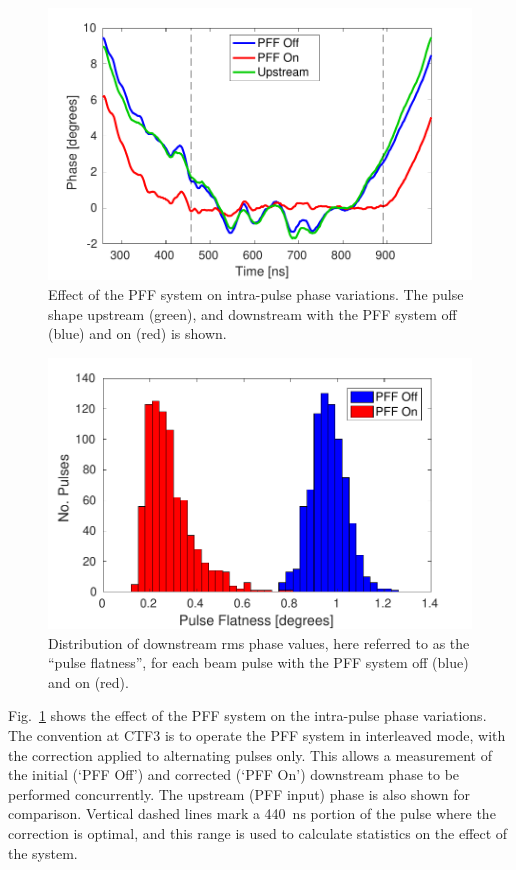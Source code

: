 \documentclass[%
 reprint,
superscriptaddress,
 amsmath,amssymb,
 prl,
]{revtex4-1}
\begin{document}
\begin{figure}
	\includegraphics[width=\columnwidth]{figs/shape}%
	\caption{\label{fig:shape}Effect of the PFF system on intra-pulse phase 
		variations. The pulse shape upstream (green), and downstream with the 
		PFF 
		system off (blue) and on (red) is shown.}
\end{figure}

\begin{figure}
	\includegraphics[width=\columnwidth]{figs/flatness}%
	\caption{\label{fig:flatness}Distribution of downstream rms phase values, 
		here 
		referred to as the 
		``pulse flatness'', for each beam pulse with the PFF system off (blue) 
		and 
		on (red).}
\end{figure}

Fig.~\ref{fig:shape} shows the effect of the PFF system on the intra-pulse 
phase variations. The convention at CTF3 is to operate the PFF system in 
interleaved mode, with 
the correction applied to alternating pulses only. This allows a measurement of 
the initial (`PFF Off') and corrected (`PFF On') downstream phase to be 
performed concurrently. The upstream (PFF input) phase is also shown for 
comparison. Vertical dashed lines mark a 440~ns portion of the pulse where the 
correction is optimal, and this range is used to calculate statistics on the 
effect of the system. 
\end{document}
